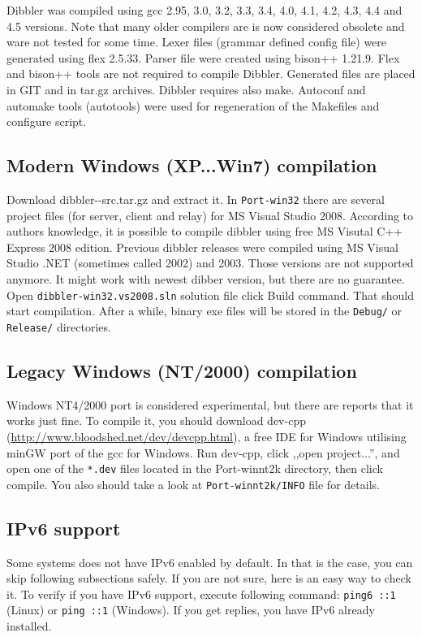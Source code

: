 Dibbler was compiled using gcc 2.95, 3.0, 3.2, 3.3, 3.4, 4.0, 4.1,
4.2, 4.3, 4.4 and 4.5 versions. Note that many older compilers are is
now considered obsolete and ware not tested for some time. Lexer files
(grammar defined config file) were generated using flex 2.5.33. Parser
file were created using bison++ 1.21.9. Flex and bison++ tools are not
required to compile Dibbler. Generated files are placed in GIT and in
tar.gz archives. Dibbler requires also make. Autoconf and automake
tools (autotools) were used for regeneration of the Makefiles and
configure script.
 
\subsection{Modern Windows (XP...Win7) compilation}
Download dibbler-\version-src.tar.gz and extract it. In
\verb+Port-win32+ there are several project files (for server, client
and relay) for MS Visual Studio 2008. According to authors knowledge,
it is possible to compile dibbler using free MS Visutal C++ Express
2008 edition. Previous dibbler releases were compiled using MS Visual
Studio .NET (sometimes called 2002) and 2003. Those versions are not
supported anymore. It might work with newest dibber version, but there
are no guarantee. Open \verb+dibbler-win32.vs2008.sln+ solution file
click Build command. That should start compilation. After a while,
binary exe files will be stored in the \verb+Debug/+ or
\verb+Release/+ directories.

\subsection{Legacy Windows (NT/2000) compilation}
Windows NT4/2000 port is considered experimental, but there are reports
that it works just fine. To compile it, you should download dev-cpp
(\url{http://www.bloodshed.net/dev/devcpp.html}), a free IDE for
Windows utilising minGW port of the gcc for Windows. Run dev-cpp,
click ,,open project...'', and open one of the \verb+*.dev+ files located
in the Port-winnt2k directory, then click compile. You also should
take a look at \verb+Port-winnt2k/INFO+ file for details.


\subsection{IPv6 support}
Some systems does not have IPv6 enabled by default. In that is the case,
you can skip following subsections safely. If you are not sure, here is
an easy way to check it. To verify if you have IPv6 support, execute
following command: \verb+ping6 ::1+ (Linux) or \verb+ping ::1+
(Windows). If you get replies, you have IPv6 already installed.

